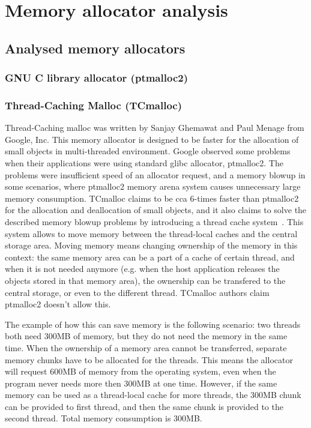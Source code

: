 \chapter{Memory allocator analysis}
\section{Analysed memory allocators}
\subsection{GNU C library allocator (ptmalloc2)}
\subsection{Thread-Caching Malloc (TCmalloc)}
Thread-Caching malloc was written by Sanjay Ghemawat and Paul Menage from
Google, Inc. This memory allocator is designed to be faster for the allocation
of small objects in multi-threaded environment. Google observed some problems
when their applications were using standard glibc allocator, ptmalloc2. The
problems were insufficient speed of an allocator request, and a memory blowup
in some scenarios, where ptmalloc2 memory arena system causes unnecessary large
memory consumption. TCmalloc claims to be cca 6-times faster than ptmalloc2 for
the allocation and deallocation of small objects, and it also claims to solve
the described memory blowup problems by introducing a thread cache
system~\cite{tcmalloc}. This system allows to move memory between the
thread-local caches and the central storage area. Moving memory means changing ownership of the memory in
this context: the same memory area can be a part of a cache of certain thread, and
when it is not needed anymore (e.g. when the host application releases the
objects stored in that memory area), the ownership can be transfered to the
central storage, or even to the different thread. TCmalloc authors claim
ptmalloc2 doesn't allow this.

The example of how this can save memory is the following scenario: two threads
both need 300MB of memory, but they do not need the memory in the same time.
When the ownership of a memory area cannot be transferred, separate memory
chunks have to be allocated for the threads. This means the allocator will
request 600MB of memory from the operating system, even when the program never
needs more then 300MB at one time. However, if the same memory can be used as a
thread-local cache for more threads, the 300MB chunk can be provided to first
thread, and then the same chunk is provided to the second thread. Total memory
consumption is 300MB.

